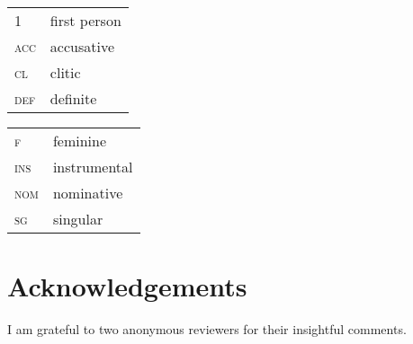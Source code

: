 \documentclass[output=paper,modfonts,newtxmath,hidelinks,]{langscibook}
\begin{document}
\begin{tabularx}{.5\textwidth}{@{}lQ@{}}
\textsc{1}&first person\\
\textsc{acc}&{accusative}\\
\textsc{cl}&{clitic}\\
\textsc{def}&definite\\
\end{tabularx}%
\begin{tabularx}{.5\textwidth}{@{}lQ@{}}
\textsc{f}&{feminine}\\
\textsc{ins}&{instrumental}\\
\textsc{nom}&{nominative}\\
\textsc{sg}&singular\\
\end{tabularx}

\section*{Acknowledgements}

I am grateful to two anonymous reviewers for their insightful comments.

\sloppy
\printbibliography[heading=subbibliography,notkeyword=this]
\end{document}
